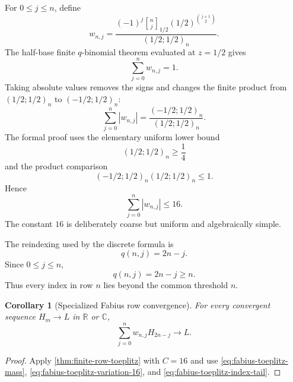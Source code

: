 \documentclass[11pt,oneside]{article}
\newtheorem{corollary}[theorem]{Corollary}
\theoremstyle{definition}
\theoremstyle{remark}
\newcommand{\R}{\mathbb R}
\newcommand{\C}{\mathbb C}
\newcommand{\qbinom}[3]{\genfrac{[}{]}{0pt}{}{#1}{#2}_{#3}}
\begin{document}
For $0\le j\le n$, define
\begin{equation}
 w_{n,j}=\frac{(-1)^j
 \qbinom{n}{j}{1/2}
 (1/2)^{\binom{j+1}{2}}}{(1/2;1/2)_n}.
 \label{eq:fabius-toeplitz-weight}
\end{equation}
The half-base finite $q$-binomial theorem evaluated at $z=1/2$ gives
\begin{equation}
 \sum_{j=0}^{n}w_{n,j}=1.
 \label{eq:fabius-toeplitz-mass}
\end{equation}
Taking absolute values removes the signs and changes the finite product from
$(1/2;1/2)_n$ to $(-1/2;1/2)_n$:
\begin{equation}
 \sum_{j=0}^{n}|w_{n,j}|
 =\frac{(-1/2;1/2)_n}{(1/2;1/2)_n}.
 \label{eq:fabius-toeplitz-exact-variation}
\end{equation}
The formal proof uses the elementary uniform lower bound
\begin{equation}
 (1/2;1/2)_n\ge\frac14
 \label{eq:half-q-lower-quarter}
\end{equation}
and the product comparison
\begin{equation}
 (-1/2;1/2)_n(1/2;1/2)_n\le1.
 \label{eq:q-product-comparison}
\end{equation}
Hence
\begin{equation}
 \sum_{j=0}^{n}|w_{n,j}|\le16.
 \label{eq:fabius-toeplitz-variation-16}
\end{equation}
The constant $16$ is deliberately coarse but uniform and algebraically simple.

The reindexing used by the discrete formula is
\begin{equation}
 q(n,j)=2n-j.
 \label{eq:fabius-toeplitz-index}
\end{equation}
Since $0\le j\le n$,
\begin{equation}
 q(n,j)=2n-j\ge n.
 \label{eq:fabius-toeplitz-index-tail}
\end{equation}
Thus every index in row $n$ lies beyond the common threshold $n$.

\begin{corollary}[Specialized Fabius row convergence]
\label{cor:fabius-toeplitz-convergence}
For every convergent sequence $H_m\to L$ in $\R$ or $\C$,
\begin{equation}
 \sum_{j=0}^{n}w_{n,j}H_{2n-j}\longrightarrow L.
 \label{eq:fabius-toeplitz-convergence}
\end{equation}
\end{corollary}

\begin{proof}
Apply \cref{thm:finite-row-toeplitz} with $C=16$ and use
\eqref{eq:fabius-toeplitz-mass}, \eqref{eq:fabius-toeplitz-variation-16}, and
\eqref{eq:fabius-toeplitz-index-tail}.
\end{proof}
\end{document}
